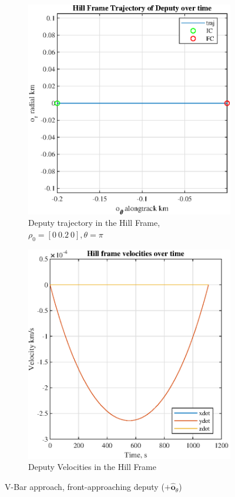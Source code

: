 \documentclass[conf]{new-aiaa}
\begin{document}
\begin{singlespace}
 \begin{figure}[htpb!]
\begin{subfigure}{.5\textwidth}
  \centering
  \includegraphics[width=.8\linewidth]{figures/traj.eps}
  \caption{Deputy trajectory in the Hill Frame, $\rho_0 = [0  \ 0.2 \ 0], \theta=\pi $}
  \label{fig:traj_v}
\end{subfigure}%
\begin{subfigure}{.5\textwidth}
  \centering
  \includegraphics[width=.8\linewidth]{figures/hillvels.eps}
  \caption{Deputy Velocities in the Hill Frame}
  \label{fig:vels_v}
\end{subfigure}
\caption{V-Bar approach, front-approaching deputy ($+\bm{\hat{o}}_\theta$)}
\label{fig:v1}
\end{figure}


\end{singlespace}
\end{document}
